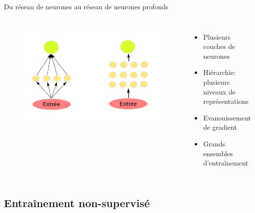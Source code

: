\documentclass{beamer}
\begin{document}
\begin{frame}{Du réseau de neurones au réseau de neurones profonds}

  \begin{columns}
    \begin{figure}
      \centering
      \includegraphics[scale=0.1750]{../Figures/Deep}
    \end{figure}

    \begin{itemize}
    \item Plusieurs couches de neurones \pause
    \item Hiérarchie: plusieurs niveaux de représentations \pause
    \item Evanouissement de gradient \pause
    \item Grands ensembles d'entraînement \pause
    \end{itemize}
  \end{columns}

\end{frame}

\subsection{Entraînement non-supervisé}
\end{document}
